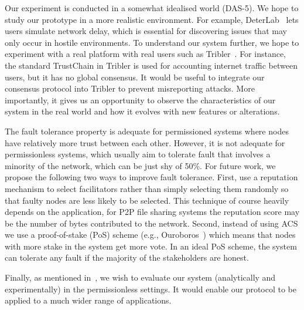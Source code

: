 Our experiment is conducted in a somewhat idealised world (DAS-5).
We hope to study our prototype in a more realistic environment.
For example, DeterLab~\cite{mirkovic2012teaching} lets users simulate network delay,
which is essential for discovering issues that may only occur in hostile environments.
To understand our system further, we hope to experiment with a real platform with real users such as Tribler~\cite{pouwelse2008tribler}.
For instance, the standard TrustChain in Tribler is used for accounting internet traffic between users,
but it has no global consensus.
It would be useful to integrate our consensus protocol into Tribler to prevent misreporting attacks.
More importantly, it gives us an opportunity to observe the characteristics of our system in the real world and how it evolves with new features or alterations.

The fault tolerance property is adequate for permissioned systems where nodes have relatively more trust between each other.
However, it is not adequate for permissionless systems,
which usually aim to tolerate fault that involves a minority of the network,
which can be just shy of 50\%.
For future work, we propose the following two ways to improve fault tolerance.
First, use a reputation mechanism to select facilitators rather than simply selecting them randomly so that faulty nodes are less likely to be selected.
This technique of course heavily depends on the application,
for P2P file sharing systems the reputation score may be the number of bytes contributed to the network.
Second, instead of using ACS we use a proof-of-stake (PoS) scheme (e.g., Ouroboros~\cite{kiayias2017ouroboros}) which means that nodes with more stake in the system get more vote.
In an ideal PoS scheme, the system can tolerate any fault if the majority of the stakeholders are honest.

Finally, as mentioned in~, we wish to evaluate our system (analytically and experimentally) in the permissionless settings.
It would enable our protocol to be applied to a much wider range of applications.
